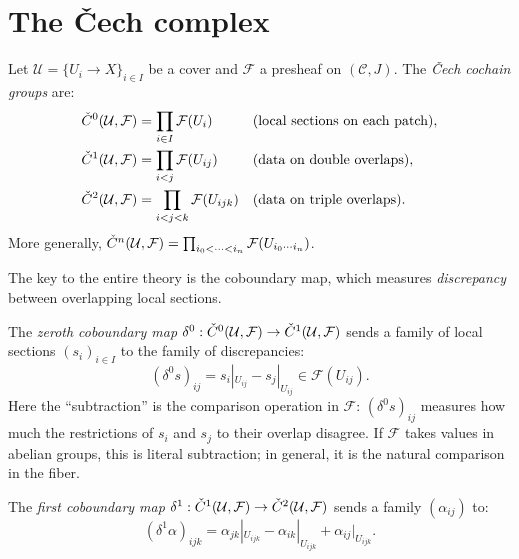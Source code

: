 
\section{The \v{C}ech complex}
\label{sec:cech:complex}

\begin{definition}
\label{def:cech-cochain}
Let $\mathcal{U} = \{U_i \to X\}_{i \in I}$ be a cover and
$\mathcal{F}$ a presheaf on $(\mathcal{C}, J)$.  The \emph{\v{C}ech
cochain groups} are:
\begin{align}
  \check{C}^0(\mathcal{U}, \mathcal{F})
    &= \prod_{i \in I} \mathcal{F}(U_i)
    && \text{(local sections on each patch)}, \\
  \check{C}^1(\mathcal{U}, \mathcal{F})
    &= \prod_{i < j} \mathcal{F}(U_{ij})
    && \text{(data on double overlaps)}, \\
  \check{C}^2(\mathcal{U}, \mathcal{F})
    &= \prod_{i < j < k} \mathcal{F}(U_{ijk})
    && \text{(data on triple overlaps)}.
\end{align}
More generally, $\check{C}^n(\mathcal{U}, \mathcal{F}) =
\prod_{i_0 < \cdots < i_n} \mathcal{F}(U_{i_0 \cdots i_n})$.
\end{definition}

The key to the entire theory is the coboundary map, which measures
\emph{discrepancy} between overlapping local sections.

\begin{definition}
\label{def:coboundary}
The \emph{zeroth coboundary map}
$\delta^0 : \check{C}^0(\mathcal{U}, \mathcal{F})
\to \check{C}^1(\mathcal{U}, \mathcal{F})$
sends a family of local sections $(s_i)_{i \in I}$ to the family of
discrepancies:
\[
  (\delta^0 s)_{ij}
  = s_i|_{U_{ij}} - s_j|_{U_{ij}}
  \in \mathcal{F}(U_{ij}).
\]
Here the ``subtraction'' is the comparison operation in $\mathcal{F}$:
$(\delta^0 s)_{ij}$ measures how much the restrictions of $s_i$ and $s_j$
to their overlap disagree.  If $\mathcal{F}$ takes values in abelian
groups, this is literal subtraction; in general, it is the natural
comparison in the fiber.

The \emph{first coboundary map}
$\delta^1 : \check{C}^1(\mathcal{U}, \mathcal{F})
\to \check{C}^2(\mathcal{U}, \mathcal{F})$
sends a family $(\alpha_{ij})$ to:
\[
  (\delta^1 \alpha)_{ijk}
  = \alpha_{jk}|_{U_{ijk}} - \alpha_{ik}|_{U_{ijk}} + \alpha_{ij}|_{U_{ijk}}.
\]
\end{definition}

